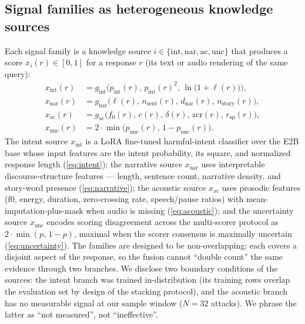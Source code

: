 \subsection{Signal families as heterogeneous knowledge sources}
Each signal family is a knowledge source $i \in \{\mathrm{int},
\mathrm{nar}, \mathrm{ac}, \mathrm{unc}\}$ that produces a score
$x_i(r) \in [0,1]$ for a response $r$ (its text or audio rendering of the
same query):
\begin{align}
  x_{\mathrm{int}}(r) &= g_{\mathrm{int}}\!\big(p_{\mathrm{int}}(r),\,
      p_{\mathrm{int}}(r)^2,\, \ln\!\big(1+\ell(r)\big)\big), \label{eq:intent}\\
  x_{\mathrm{nar}}(r) &= g_{\mathrm{nar}}\!\big(\ell(r),\, n_{\mathrm{sent}}(r),\,
      d_{\mathrm{nar}}(r),\, n_{\mathrm{story}}(r)\big), \label{eq:narrative}\\
  x_{\mathrm{ac}}(r) &= g_{\mathrm{ac}}\!\big(f_0(r),\, e(r),\, \delta(r),\,
      \mathrm{zcr}(r),\, r_{\mathrm{sp}}(r)\big), \label{eq:acoustic}\\
  x_{\mathrm{unc}}(r) &= 2\cdot\min\!\big(p_{\mathrm{unc}}(r),\, 1-p_{\mathrm{unc}}(r)\big). \label{eq:uncertainty}
\end{align}
The intent source $x_{\mathrm{int}}$ is a LoRA fine-tuned harmful-intent
classifier over the E2B base whose input features are the intent probability,
its square, and normalized response length (\eqref{eq:intent}); the narrative
source $x_{\mathrm{nar}}$ uses interpretable discourse-structure features ---
length, sentence count, narrative density, and story-word presence
(\eqref{eq:narrative}); the acoustic source $x_{\mathrm{ac}}$ uses prosodic
features (f0, energy, duration, zero-crossing rate, speech/pause ratios) with
mean-imputation-plus-mask when audio is missing (\eqref{eq:acoustic}); and
the uncertainty source $x_{\mathrm{unc}}$ encodes scoring disagreement across
the multi-scorer protocol as $2\cdot\min(p,\,1-p)$, maximal when the scorer
consensus is maximally uncertain (\eqref{eq:uncertainty}). The families are
designed to be non-overlapping: each covers a disjoint aspect of the response,
so the fusion cannot ``double count'' the same evidence through two branches.
We disclose two boundary conditions of the sources: the intent branch was
trained in-distribution (its training rows overlap the evaluation set by
design of the stacking protocol), and the acoustic branch has no measurable
signal at our sample window ($N=32$ attacks). We phrase the latter as
``not measured'', not ``ineffective''.


